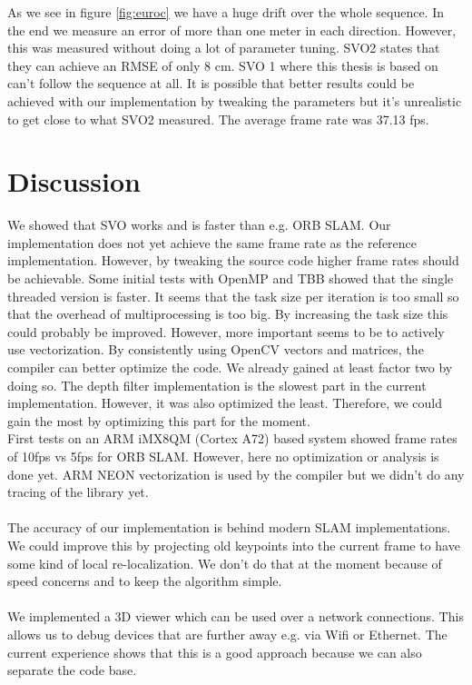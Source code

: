 \documentclass[11pt,a4paper,titlepage,oneside]{report}
\begin{document}
As we see in figure \ref{fig:euroc} we have a huge drift over the whole sequence. In the end we measure an error of more than one meter in each direction. However, this was measured without doing a lot of parameter tuning. SVO2 states that they can achieve an RMSE of only 8 cm. SVO 1 where this thesis is based on can't follow the sequence at all. It is possible that better results could be achieved with our implementation by tweaking the parameters but it's unrealistic to get close to what SVO2 measured. The average frame rate was 37.13 fps.

\chapter{Discussion}\label{ch:discussion}

We showed that SVO works and is faster than e.g. ORB SLAM. Our implementation does not yet achieve the same frame rate as the reference implementation. However, by tweaking the source code higher frame rates should be achievable. Some initial tests with OpenMP and TBB showed that the single threaded version is faster. It seems that the task size per iteration is too small so that the overhead of multiprocessing is too big. By increasing the task size this could probably be improved. However, more important seems to be to actively use vectorization. By consistently using OpenCV vectors and matrices, the compiler can better optimize the code. We already gained at least factor two by doing so. The depth filter implementation is the slowest part in the current implementation. However, it was also optimized the least. Therefore, we could gain the most by optimizing this part for the moment.\\
First tests on an ARM iMX8QM (Cortex A72) based system showed frame rates of 10fps vs 5fps for ORB SLAM. However, here no optimization or analysis is done yet. ARM NEON vectorization is used by the compiler but we didn't do any tracing of the library yet.\\\\
The accuracy of our implementation is behind modern SLAM implementations. We could improve this by projecting old keypoints into the current frame to have some kind of local re-localization. We don't do that at the moment because of speed concerns and to keep the algorithm simple.\\\\
We implemented a 3D viewer which can be used over a network connections. This allows us to debug devices that are further away e.g. via Wifi or Ethernet. The current experience shows that this is a good approach because we can also separate the code base.\\\\
\end{document}

